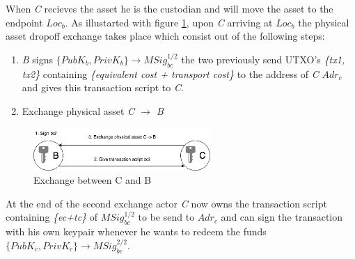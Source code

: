  When \textit{C} recieves the asset he is the custodian and will move the asset to the endpoint \(Loc_b\). As illustarted with figure \ref{fig:3 dropoff exchange}, upon \textit{C} arriving at \(Loc_b\) the physical asset dropoff exchange takes place which consist out of the following steps:

\begin{enumerate}
  \item \textit{B} signs \(\{PubK_b, PrivK_b\} \rightarrow MSig_{bc}^{1/2}\) the two previously send UTXO's \textit{\{tx1, tx2\}} containing \textit{\{equivalent cost + transport cost\}} to the address of \textit{C} \(Adr_c\) and gives this transaction script to \textit{C}.
  \item Exchange physical asset \textit{C $\rightarrow$ B}
\end{enumerate}

\begin{figure}[h]
\centering
\includegraphics[width=0.6\textwidth]{images/exchange_02.png}
\caption{Exchange between C and B}
\label{fig:3 dropoff exchange}
\end{figure}

At the end of the second exchange actor \textit{C} now owns the transaction script containing \textit{\{ec+tc\}} of \(MSig_{bc}^{1/2}\) to be send to \(Adr_c\) and can sign the transaction with his own keypair whenever he wants to redeem the funds \(\{PubK_c, PrivK_c\} \rightarrow MSig_{bc}^{2/2}\).

